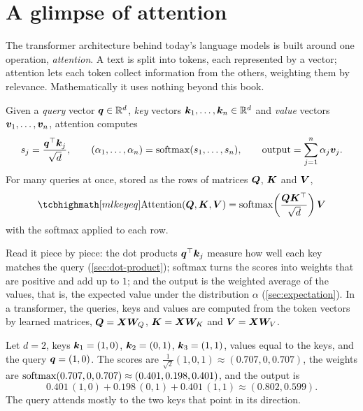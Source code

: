 \section{A glimpse of attention}\label{sec:attention}

The transformer architecture behind today's language models is built around one
operation, \emph{attention}. A text is split into tokens, each represented by a
vector; attention lets each token collect information from the others, weighting
them by relevance. Mathematically it uses nothing beyond this book.

\begin{definition}\label{def:attention}
Given a \emph{query} vector $\bm{q} \in \mathbb{R}^d$, \emph{key} vectors
$\bm{k}_1, \dots, \bm{k}_n \in \mathbb{R}^d$ and \emph{value} vectors $\bm{v}_1, \dots, \bm{v}_n$,
attention computes
\[
  s_j = \frac{\bm{q}^\top\bm{k}_j}{\sqrt d}, \qquad
  (\alpha_1, \dots, \alpha_n) = \operatorname{softmax}(s_1, \dots, s_n), \qquad
  \text{output} = \sum_{j=1}^n\alpha_j\bm{v}_j .
\]
For many queries at once, stored as the rows of matrices $\bm{Q}$, $\bm{K}$ and
$\bm{V}$,
\[
  \keyeq{\operatorname{Attention}(\mQ, \mK, \mV)
  = \softmax\!\left(\frac{\mQ\mK^\top}{\sqrt d}\right)\mV}
\]
with the softmax applied to each row.
\end{definition}

Read it piece by piece: the dot products $\bm{q}^\top\bm{k}_j$ measure how well each key
matches the query (\cref{sec:dot-product}); softmax turns the scores into weights
that are positive and add up to $1$; and the output is the weighted average of the
values, that is, the expected value under the distribution $\alpha$
(\cref{sec:expectation}). In a transformer, the queries, keys and values are
computed from the token vectors by learned matrices, $\bm{Q} = \bm{X}\bm{W}_Q$,
$\bm{K} = \bm{X}\bm{W}_K$ and $\bm{V} = \bm{X}\bm{W}_V$.

\begin{example}\label{ex:attention}
Let $d = 2$, keys $\bm{k}_1 = (1, 0)$, $\bm{k}_2 = (0, 1)$, $\bm{k}_3 = (1, 1)$, values equal
to the keys, and the query $\bm{q} = (1, 0)$. The scores are
$\frac{1}{\sqrt2}(1, 0, 1) \approx (0.707, 0, 0.707)$, the weights are
$\operatorname{softmax}(0.707, 0, 0.707) \approx (0.401, 0.198, 0.401)$, and the output is
\[
  0.401\,(1, 0) + 0.198\,(0, 1) + 0.401\,(1, 1) \approx (0.802, 0.599).
\]
The query attends mostly to the two keys that point in its direction.
\end{example}

